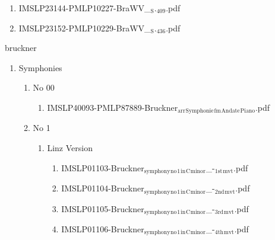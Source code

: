 \documentclass[11pt]{article}
\begin{document}
\begin{enumerate}
\begin{enumerate}
\item IMSLP23144-PMLP10227-BraWV\_$_{\text{S}}$.$_{\text{409}}$.pdf
\label{sec-1-1-1-1-44-15-16-2}

\item IMSLP23152-PMLP10229-BraWV\_$_{\text{S}}$.$_{\text{436}}$.pdf
\label{sec-1-1-1-1-44-15-16-3}
\end{enumerate}
\end{enumerate}

\item bruckner
\label{sec-1-1-1-1-44-16}
\begin{enumerate}
\item Symphonies
\label{sec-1-1-1-1-44-16-1}
\begin{enumerate}
\item No 00
\label{sec-1-1-1-1-44-16-1-1}
\begin{enumerate}
\item IMSLP40093-PMLP87889-Bruckner$_{\text{arr}}$$_{\text{Symphonie}}$$_{\text{fm}}$$_{\text{Andate}}$$_{\text{Piano}}$.pdf
\label{sec-1-1-1-1-44-16-1-1-1}
\end{enumerate}

\item No 1
\label{sec-1-1-1-1-44-16-1-2}
\begin{enumerate}
\item Linz Version
\label{sec-1-1-1-1-44-16-1-2-1}
\begin{enumerate}
\item IMSLP01103-Bruckner$_{\text{symphony}}$$_{\text{no}}$$_{\text{1}}$$_{\text{in}}$$_{\text{C}}$$_{\text{minor}}$\_-$_{\text{1st}}$$_{\text{mvt}}$.pdf
\label{sec-1-1-1-1-44-16-1-2-1-1}

\item IMSLP01104-Bruckner$_{\text{symphony}}$$_{\text{no}}$$_{\text{1}}$$_{\text{in}}$$_{\text{C}}$$_{\text{minor}}$\_-$_{\text{2nd}}$$_{\text{mvt}}$.pdf
\label{sec-1-1-1-1-44-16-1-2-1-2}

\item IMSLP01105-Bruckner$_{\text{symphony}}$$_{\text{no}}$$_{\text{1}}$$_{\text{in}}$$_{\text{C}}$$_{\text{minor}}$\_-$_{\text{3rd}}$$_{\text{mvt}}$.pdf
\label{sec-1-1-1-1-44-16-1-2-1-3}

\item IMSLP01106-Bruckner$_{\text{symphony}}$$_{\text{no}}$$_{\text{1}}$$_{\text{in}}$$_{\text{C}}$$_{\text{minor}}$\_-$_{\text{4th}}$$_{\text{mvt}}$.pdf
\label{sec-1-1-1-1-44-16-1-2-1-4}
\end{enumerate}


\end{enumerate}
\end{enumerate}
\end{enumerate}
\end{document}

